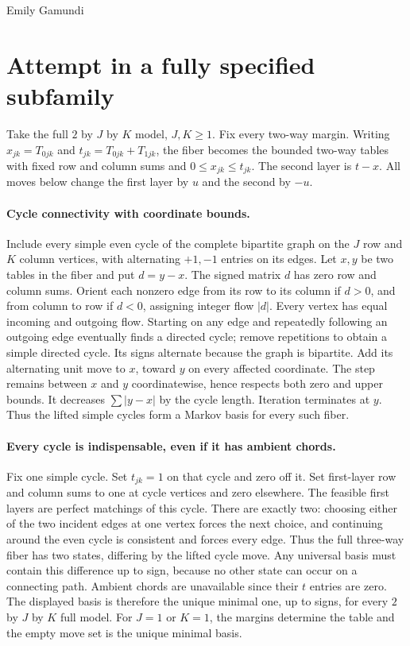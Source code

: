 \documentclass[11pt]{article}
\begin{document}
Emily Gamundi

\section{Attempt in a fully specified subfamily}
Take the full $2$ by $J$ by $K$ model, $J,K\ge1$. Fix every two-way
margin. Writing $x_{jk}=T_{0jk}$ and $t_{jk}=T_{0jk}+T_{1jk}$, the
fiber becomes the bounded two-way tables with fixed row and column sums
and $0\le x_{jk}\le t_{jk}$. The second layer is $t-x$. All moves
below change the first layer by $u$ and the second by $-u$.

\paragraph{Cycle connectivity with coordinate bounds.}
Include every simple even cycle of the complete bipartite graph on the
$J$ row and $K$ column vertices, with alternating $+1,-1$ entries on
its edges. Let $x,y$ be two tables in the fiber and put $d=y-x$.
The signed matrix $d$ has zero row and column sums. Orient each nonzero
edge from its row to its column if $d>0$, and from column to row if
$d<0$, assigning integer flow $|d|$. Every vertex has equal incoming
and outgoing flow. Starting on any edge and repeatedly following an
outgoing edge eventually finds a directed cycle; remove repetitions to
obtain a simple directed cycle. Its signs alternate because the graph
is bipartite. Add its alternating unit move to $x$, toward $y$ on
every affected coordinate. The step remains between $x$ and $y$
coordinatewise, hence respects both zero and upper bounds. It decreases
$\sum|y-x|$ by the cycle length. Iteration terminates at $y$.
Thus the lifted simple cycles form a Markov basis for every such fiber.

\paragraph{Every cycle is indispensable, even if it has ambient chords.}
Fix one simple cycle. Set $t_{jk}=1$ on that cycle and zero off it.
Set first-layer row and column sums to one at cycle vertices and zero
elsewhere. The feasible first layers are perfect matchings of this
cycle. There are exactly two: choosing either of the two incident edges
at one vertex forces the next choice, and continuing around the even
cycle is consistent and forces every edge. Thus the full three-way
fiber has two states, differing by the lifted cycle move. Any universal
basis must contain this difference up to sign, because no other state
can occur on a connecting path. Ambient chords are unavailable since
their $t$ entries are zero. The displayed basis is therefore the unique
minimal one, up to signs, for every $2$ by $J$ by $K$ full model.
For $J=1$ or $K=1$, the margins determine the table and the empty
move set is the unique minimal basis.
\end{document}

